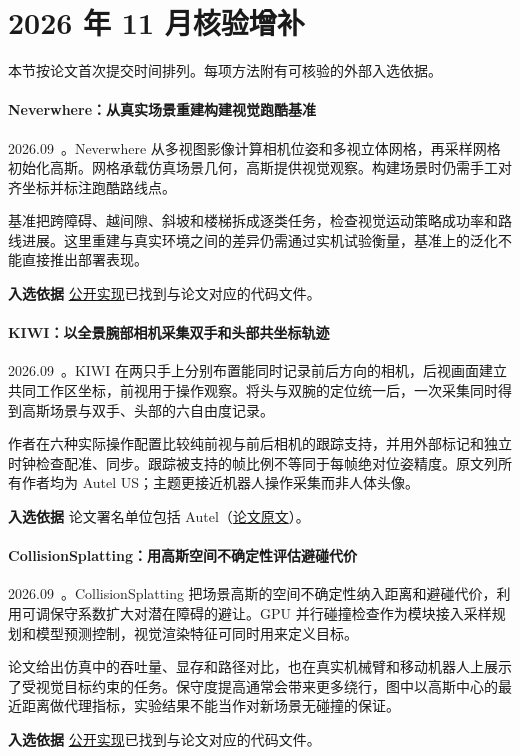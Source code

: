 \section{2026 年 11 月核验增补}

本节按论文首次提交时间排列。每项方法附有可核验的外部入选依据。

\paragraph{Neverwhere：从真实场景重建构建视觉跑酷基准}
2026.09~\cite{2609_16443}。Neverwhere 从多视图影像计算相机位姿和多视立体网格，再采样网格初始化高斯。网格承载仿真场景几何，高斯提供视觉观察。构建场景时仍需手工对齐坐标并标注跑酷路线点。

基准把跨障碍、越间隙、斜坡和楼梯拆成逐类任务，检查视觉运动策略成功率和路线进展。这里重建与真实环境之间的差异仍需通过实机试验衡量，基准上的泛化不能直接推出部署表现。

\textbf{入选依据} \href{https://github.com/ziyc/neverwhere}{公开实现}已找到与论文对应的代码文件。

\paragraph{KIWI：以全景腕部相机采集双手和头部共坐标轨迹}
2026.09~\cite{2609_22809}。KIWI 在两只手上分别布置能同时记录前后方向的相机，后视画面建立共同工作区坐标，前视用于操作观察。将头与双腕的定位统一后，一次采集同时得到高斯场景与双手、头部的六自由度记录。

作者在六种实际操作配置比较纯前视与前后相机的跟踪支持，并用外部标记和独立时钟检查配准、同步。跟踪被支持的帧比例不等同于每帧绝对位姿精度。原文列所有作者均为 Autel US；主题更接近机器人操作采集而非人体头像。

\textbf{入选依据} 论文署名单位包括 Autel（\href{https://arxiv.org/html/2609.22809v1}{论文原文}）。

\paragraph{CollisionSplatting：用高斯空间不确定性评估避碰代价}
2026.09~\cite{2609_35619}。CollisionSplatting 把场景高斯的空间不确定性纳入距离和避碰代价，利用可调保守系数扩大对潜在障碍的避让。GPU 并行碰撞检查作为模块接入采样规划和模型预测控制，视觉渲染特征可同时用来定义目标。

论文给出仿真中的吞吐量、显存和路径对比，也在真实机械臂和移动机器人上展示了受视觉目标约束的任务。保守度提高通常会带来更多绕行，图中以高斯中心的最近距离做代理指标，实验结果不能当作对新场景无碰撞的保证。

\textbf{入选依据} \href{https://github.com/machines-in-motion/collisionsplatting}{公开实现}已找到与论文对应的代码文件。
